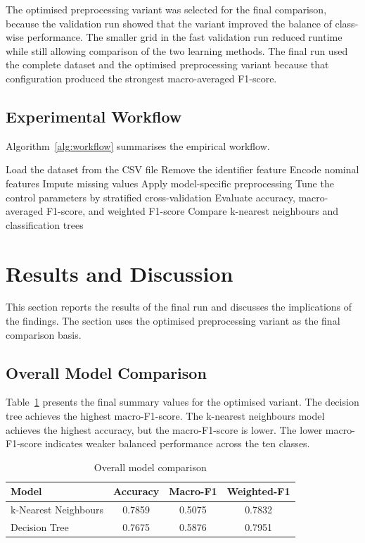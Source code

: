 \documentclass[conference,10pt]{IEEEtran}
\begin{document}
The optimised preprocessing variant was selected for the final comparison, because the validation run showed that the variant improved the balance of class-wise performance. The smaller grid in the fast validation run reduced runtime while still allowing comparison of the two learning methods. The final run used the complete dataset and the optimised preprocessing variant because that configuration produced the strongest macro-averaged F1-score.

\subsection{Experimental Workflow}
Algorithm~\ref{alg:workflow} summarises the empirical workflow.

\begin{algorithm}
\caption{Experimental workflow}
\label{alg:workflow}
\begin{algorithmic}[1]
\State Load the dataset from the CSV file
\State Remove the identifier feature
\State Encode nominal features
\State Impute missing values
\State Apply model-specific preprocessing
\State Tune the control parameters by stratified cross-validation
\State Evaluate accuracy, macro-averaged F1-score, and weighted F1-score
\State Compare k-nearest neighbours and classification trees
\end{algorithmic}
\end{algorithm}

\section{Results and Discussion}
This section reports the results of the final run and discusses the implications of the findings. The section uses the optimised preprocessing variant as the final comparison basis.

\subsection{Overall Model Comparison}
Table~\ref{tab:model_comparison} presents the final summary values for the optimised variant. The decision tree achieves the highest macro-F1-score. The k-nearest neighbours model achieves the highest accuracy, but the macro-F1-score is lower. The lower macro-F1-score indicates weaker balanced performance across the ten classes.

\begin{table}[H]
\caption{Overall model comparison}
\label{tab:model_comparison}
\centering
\begin{tabular}{lccc}
\toprule
Model & Accuracy & Macro-F1 & Weighted-F1 \\
\midrule
k-Nearest Neighbours & 0.7859 & 0.5075 & 0.7832 \\
Decision Tree & 0.7675 & 0.5876 & 0.7951 \\
\bottomrule
\end{tabular}
\end{table}
\end{document}

